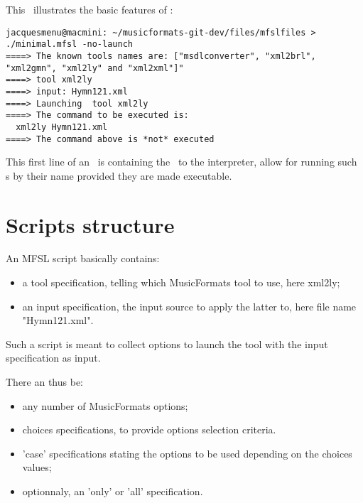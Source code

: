 This \script\ illustrates the basic features of \mfslLang:
\begin{lstlisting}[language=MFSL]
jacquesmenu@macmini: ~/musicformats-git-dev/files/mfslfiles > ./minimal.mfsl -no-launch
====> The known tools names are: ["msdlconverter", "xml2brl", "xml2gmn", "xml2ly" and "xml2xml"]"
====> tool xml2ly
====> input: Hymn121.xml
====> Launching  tool xml2ly
====> The command to be executed is:
  xml2ly Hymn121.xml
====> The command above is *not* executed
\end{lstlisting}

This first line of an \mfslLang\ \script is  containing the \filePath\ to the interpreter, allow for running such \script s by their name provided they are made executable.


\section{Scripts structure}

An MFSL script basically contains:
\begin{itemize}
\item a tool specification, telling which MusicFormats tool
    to use, here xml2ly;

\item  an input specification, the input source to apply
    the latter to, here file name "Hymn121.xml".
\end{itemize}

Such a script is meant to collect options to launch the tool
with the input specification as input.

There an thus be:
\begin{itemize}
\item  any number of MusicFormats options;

\item  choices specifications, to provide options selection criteria.


\item 'case' specifications stating the options to be used depending on
  the choices values;

\item optionnaly, an 'only' or 'all' specification.

\end{itemize}


